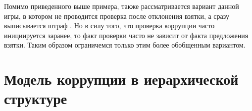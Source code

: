 \par
Помимо приведенного выше примера, также рассматривается вариант данной игры, в котором не проводится проверка после отклонения взятки, а сразу выписывается штраф \cite{Spengler}. Но в силу того, что проверка коррупции часто инициируется заранее, то факт проверки часто не зависит от факта предложения взятки. Таким образом ограничемся только этим более обобщенным вариантом.
\section{Модель коррупции в иерархической структуре}
